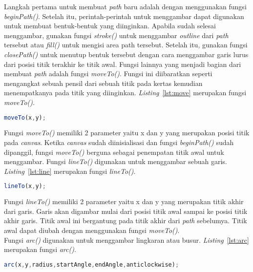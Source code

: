 Langkah pertama untuk membuat \textit{path} baru adalah dengan menggunakan fungsi \textit{beginPath()}. Setelah itu, perintah-perintah untuk menggambar dapat digunakan untuk membuat bentuk-bentuk yang diinginkan. Apabila sudah selesai menggambar, gunakan fungsi \textit{stroke()} untuk menggambar \textit{outline} dari \textit{path} tersebut atau \textit{fill()} untuk mengisi area path tersebut. Setelah itu, gunakan fungsi \textit{closePath()} untuk menutup bentuk tersebut dengan cara menggambar garis lurus dari posisi titik terakhir ke titik awal. Fungsi lainnya yang menjadi bagian dari membuat \textit{path} adalah fungsi \textit{moveTo()}. Fungsi ini diibaratkan seperti mengangkat sebuah pensil dari sebuah titik pada kertas kemudian menempatkanya pada titik yang diinginkan. \textit{Listing}~\ref{lst:move} merupakan fungsi \textit{moveTo()}.

\begin{lstlisting}[language=Javascript, caption=Fungsi \textit{moveTo()}, label={lst:move}]
	moveTo(x,y);
\end{lstlisting}

Fungsi \textit{moveTo()} memiliki 2 parameter yaitu x dan y yang merupakan posisi titik pada \textit{canvas}. Ketika \textit{canvas} sudah diinisialisasi dan fungsi \textit{beginPath()} sudah dipanggil, fungsi \textit{moveTo()} berguna sebagai penempatan titik awal untuk menggambar. Fungsi \textit{lineTo()} digunakan untuk menggambar sebuah garis. \textit{Listing}~\ref{lst:line} merupakan fungsi \textit{lineTo()}.

\begin{lstlisting}[language=Javascript, caption=Fungsi \textit{lineTo()}, label={lst:line}]
	lineTo(x,y);
\end{lstlisting}

Fungsi \textit{lineTo()} memiliki 2 parameter yaitu x dan y yang merupakan titik akhir dari garis. Garis akan digambar mulai dari posisi titik awal sampai ke posisi titik akhir garis. Titik awal ini bergantung pada titik akhir dari \textit{path} sebelumya. Titik awal dapat diubah dengan menggunakan fungsi \textit{moveTo()}.\\

Fungsi \textit{arc()} digunakan untuk menggambar lingkaran atau busur. \textit{Listing}~\ref{lst:arc} merupakan fungsi \textit{arc()}.

\begin{lstlisting}[language=Javascript, caption=Fungsi \textit{arc()}, label={lst:arc}]
	arc(x,y,radius,startAngle,endAngle,anticlockwise);
\end{lstlisting}

